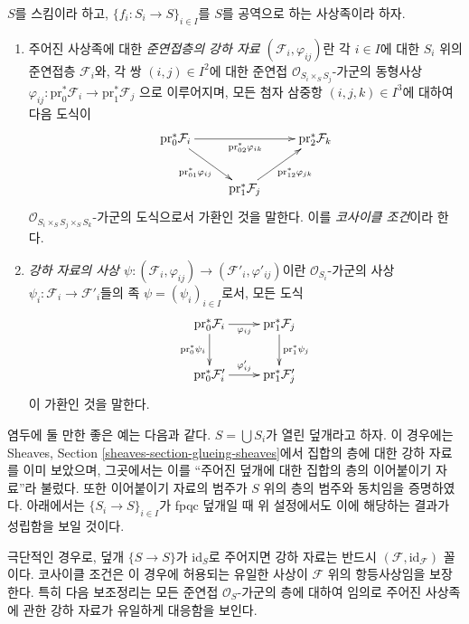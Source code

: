 \begin{definition}
\label{definition-descent-datum-quasi-coherent}
$S$를 스킴이라 하고, $\{f_i : S_i \to S\}_{i \in I}$를 $S$를 공역으로
하는 사상족이라 하자.
\begin{enumerate}
\item 주어진 사상족에 대한 {\it 준연접층의 강하 자료
$(\mathcal{F}_i, \varphi_{ij})$}란 각 $i \in I$에 대한 $S_i$ 위의
준연접층 $\mathcal{F}_i$와, 각 쌍 $(i, j) \in I^2$에 대한 준연접
$\mathcal{O}_{S_i \times_S S_j}$-가군의 동형사상
$\varphi_{ij} : \text{pr}_0^*\mathcal{F}_i \to \text{pr}_1^*\mathcal{F}_j$
으로 이루어지며, 모든 첨자 삼중항
$(i, j, k) \in I^3$에 대하여 다음 도식이
$$
\xymatrix{
\text{pr}_0^*\mathcal{F}_i \ar[rd]_{\text{pr}_{01}^*\varphi_{ij}}
\ar[rr]_{\text{pr}_{02}^*\varphi_{ik}} & &
\text{pr}_2^*\mathcal{F}_k \\
& \text{pr}_1^*\mathcal{F}_j \ar[ru]_{\text{pr}_{12}^*\varphi_{jk}} &
}
$$
$\mathcal{O}_{S_i \times_S S_j \times_S S_k}$-가군의 도식으로서
가환인 것을 말한다. 이를 {\it 코사이클 조건}이라 한다.
\item {\it 강하 자료의 사상
$\psi : (\mathcal{F}_i, \varphi_{ij}) \to
(\mathcal{F}'_i, \varphi'_{ij})$}이란 $\mathcal{O}_{S_i}$-가군의 사상
$\psi_i : \mathcal{F}_i \to \mathcal{F}'_i$들의 족
$\psi = (\psi_i)_{i\in I}$로서, 모든 도식
$$
\xymatrix{
\text{pr}_0^*\mathcal{F}_i \ar[r]_{\varphi_{ij}} \ar[d]_{\text{pr}_0^*\psi_i}
& \text{pr}_1^*\mathcal{F}_j \ar[d]^{\text{pr}_1^*\psi_j} \\
\text{pr}_0^*\mathcal{F}'_i \ar[r]^{\varphi'_{ij}} &
\text{pr}_1^*\mathcal{F}'_j \\
}
$$
이 가환인 것을 말한다.
\end{enumerate}
\end{definition}

\noindent
염두에 둘 만한 좋은 예는 다음과 같다.
$S = \bigcup S_i$가 열린 덮개라고 하자. 이 경우에는 Sheaves, Section
\ref{sheaves-section-glueing-sheaves}에서 집합의 층에 대한 강하 자료를
이미 보았으며, 그곳에서는 이를 ``주어진 덮개에 대한 집합의 층의
이어붙이기 자료''라 불렀다. 또한 이어붙이기 자료의 범주가 $S$ 위의
층의 범주와 동치임을 증명하였다. 아래에서는
$\{S_i \to S\}_{i\in I}$가 fpqc 덮개일 때 위 설정에서도 이에 해당하는
결과가 성립함을 보일 것이다.

\medskip\noindent
극단적인 경우로, 덮개 $\{S \to S\}$가 $\text{id}_S$로 주어지면 강하
자료는 반드시 $(\mathcal{F}, \text{id}_\mathcal{F})$ 꼴이다. 코사이클
조건은 이 경우에 허용되는 유일한 사상이 $\mathcal{F}$ 위의 항등사상임을
보장한다. 특히 다음 보조정리는 모든 준연접 $\mathcal{O}_S$-가군의 층에
대하여 임의로 주어진 사상족에 관한 강하 자료가 유일하게 대응함을 보인다.


